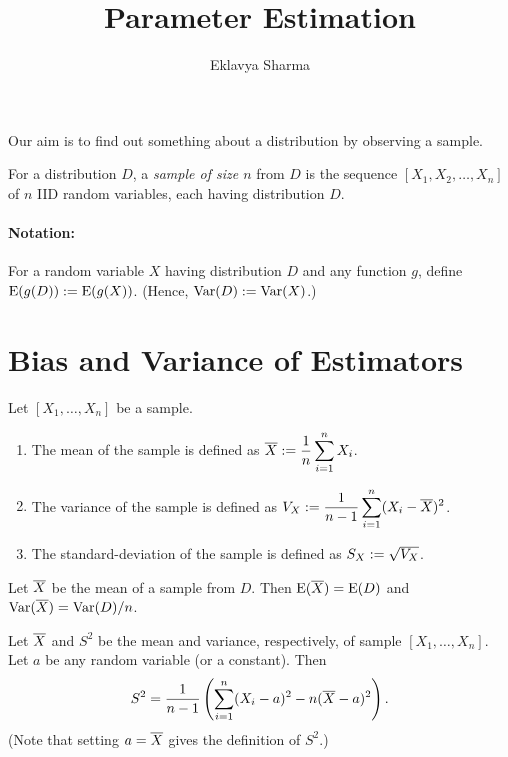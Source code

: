 \documentclass[a4paper, 12pt, fleqn]{article}
\author{Eklavya Sharma}
\date{\empty}
\title{Parameter Estimation}
\begin{document}
\maketitle
\setlength{\parskip}{0.2em}

Our aim is to find out something about a distribution by observing a sample.

\begin{definition}[Sample]
For a distribution $D$, a \emph{sample of size $n$} from $D$
is the sequence $[X_1, X_2, \ldots, X_n]$ of $n$ IID random variables,
each having distribution $D$.
\end{definition}

\paragraph{Notation:}
For a random variable $X$ having distribution $D$
and any function $g$, define $\operatorname*{E}(g(D)) := \operatorname*{E}(g(X))$.
(Hence, $\operatorname*{Var}(D) := \operatorname*{Var}(X)$.)

\section{Bias and Variance of Estimators}

\begin{definition}
Let $[X_1, \ldots, X_n]$ be a sample.
\begin{enumerate}
\item The mean of the sample is defined as
    $\displaystyle \overline{X} := \frac{1}{n}\sum_{i=1}^n X_i$.
\item The variance of the sample is defined as
    $\displaystyle V_X := \frac{1}{n-1}\sum_{i=1}^n (X_i-\overline{X})^2$.
\item The standard-deviation of the sample is defined as $S_X := \sqrt{V_X}$.
\end{enumerate}
\end{definition}

\begin{theorem}
Let $\overline{X}$ be the mean of a sample from $D$.
Then $\operatorname*{E}(\overline{X}) = \operatorname*{E}(D)$ and $\operatorname*{Var}(\overline{X}) = \operatorname*{Var}(D)/n$.
\end{theorem}

\begin{claim}
\label{thm:svar-expand}
Let $\overline{X}$ and $S^2$ be the mean and variance, respectively, of sample $[X_1, \ldots, X_n]$.
Let $a$ be any random variable (or a constant). Then
\[ S^2 = \frac{1}{n-1}\left(\sum_{i=1}^n (X_i-a)^2 - n(\overline{X}-a)^2\right). \]
(Note that setting $a = \overline{X}$ gives the definition of $S^2$.)
\end{claim}
\end{document}
